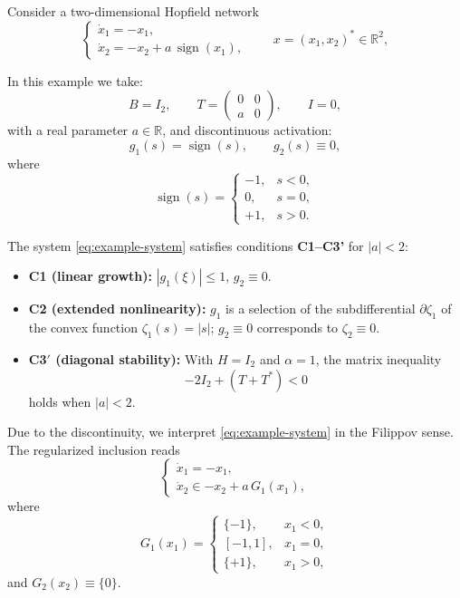 \documentclass[journal]{IEEEtran}
\theoremstyle{myplain}
\begin{document}
Consider a two-dimensional Hopfield network
\begin{equation}\label{eq:example-system}
\begin{cases}
\dot{x}_{1}=-x_{1},\\
\dot{x}_{2}=-x_{2}+a\,\operatorname{sign}(x_{1}),
\end{cases}
\qquad x=(x_{1},x_{2})^{*}\in\mathbb{R}^{2},
\end{equation}

In this example we take:
\begin{equation}\label{eq:choice}
B=I_{2},\qquad T=\begin{pmatrix}0&0\\ a&0\end{pmatrix},\qquad I=0,
\end{equation}
with a real parameter $a\in\mathbb{R}$, and discontinuous  activation:
\begin{equation}\label{eq:activation}
g_{1}(s)=\operatorname{sign}(s),\qquad g_{2}(s)\equiv 0,
\end{equation}
where 
\[
\operatorname{sign}(s)=
\begin{cases}
-1,&s<0,\\
0,&s=0,\\
+1,&s>0.
\end{cases}
\]

The system \eqref{eq:example-system} satisfies conditions \textbf{C1--C3'} for $|a|<2$:
\begin{itemize}
\item \textbf{C1 (linear growth):} $|g_{1}(\xi)|\leq 1$, $g_{2}\equiv 0$.
\item \textbf{C2 (extended nonlinearity):} $g_{1}$ is a selection of the subdifferential $\partial\zeta_{1}$ of the convex function $\zeta_{1}(s)=|s|$; $g_{2}\equiv 0$ corresponds to $\zeta_{2}\equiv 0$.
\item \textbf{C3$'$ (diagonal stability):} With $H=I_{2}$ and $\alpha=1$, the matrix inequality
\[
-2I_{2}+(T+T^{*})< 0
\]
holds when $|a|<2$.
\end{itemize}

Due to the discontinuity, we interpret \eqref{eq:example-system} in the Filippov sense. The regularized inclusion reads
\begin{equation}\label{eq:filinc-example}
\begin{cases}
\dot{x}_{1}=-x_{1},\\
\dot{x}_{2}\in -x_{2}+a\,G_{1}(x_{1}),
\end{cases}
\end{equation}
where 
\[
G_{1}(x_{1})=
\begin{cases}
\{-1\},&x_{1}<0,\\
[-1,1],&x_{1}=0,\\
\{+1\},&x_{1}>0,
\end{cases}
\]
and $G_{2}(x_{2})\equiv\{0\}$.
\end{document}

